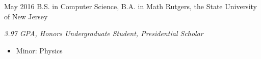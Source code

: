 \documentclass[]{friggeri-mlg-cv} %
\begin{document}
\begin{entrylist}
\entry
{May 2016}
{B.S. {\normalfont in Computer Science,} B.A. {\normalfont in Math}}
{Rutgers, the State University of New Jersey}
{\emph{3.97 GPA, Honors Undergraduate Student, Presidential Scholar}
\begin{itemize}[leftmargin=*,topsep=0pt]
\item Minor: Physics
\end{itemize}}
\\
\end{entrylist}
\end{document}
